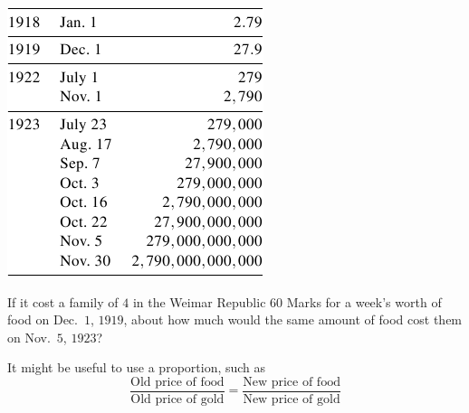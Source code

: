 \documentclass{ximera}
\begin{document}
\begin{image}
\includegraphics{InflationTable1.png}
\end{image}

\begin{question}
If it cost a family of $4$ in the Weimar Republic $60$ Marks for a week's worth of food on Dec.\ $1$, $1919$, about how much would the same amount of food cost them on Nov.\ $5$, $1923$?

\begin{multipleChoice}
\end{multipleChoice}

\begin{hint}
It might be useful to use a proportion, such as \[ \frac{\text{Old price of food}}{\text{Old price of gold}} = \frac{\text{New price of food}}{\text{New price of gold}}\]
\end{hint}
\end{question}
\end{document}
